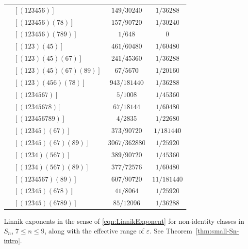 \documentclass[12pt]{amsart}
\theoremstyle{definition} \newtheorem{definition}[theorem]{Definition}
\theoremstyle{example} \newtheorem{example}[theorem]{Example}
\theoremstyle{remark} \newtheorem{remark}{Remark}[theorem]
\numberwithin{equation}{section}
\numberwithin{theorem}{section}
\renewcommand{\epsilon}{\varepsilon}
\renewcommand{\leq}{\leqslant}
\begin{document}
{\begin{table}[h]
\begin{minipage}[t]{0.45\textwidth}
\begin{tabular}{|l|l|c|c|}
					& $[(123456)]$ & $ 149/30240$ & $1/36288 $\\
					& $[(123456)(78)]$ & $ 157/90720$ & $1/30240 $\\
					& $[(123456)(789)]$ & $ 1/648$ & $ 0$\\
					& $[(123)(45)]$ & $  461/60480$ & $ 1/60480$\\
					& $[(123)(45)(67)]$ & $241/45360 $ & $1/36288 $\\
					& $[(123)(45)(67)(89)]$ & $67/5670 $ & $ 1/20160$\\
					& $[(123)(456)(78)]$ & $ 943/181440$ & $1/36288 $\\
					& $[(1234567)]$ & $ 5/1008$ & $ 1/45360$\\
					& $[(12345678)]$ & $ 67/18144$ & $1/60480 $ \\
					& $[(123456789)]$ & $ 4/2835$ & $1/22680 $ \\
					& $[(12345)(67)]$ & $ 373/90720$ & $1/181440 $ \\
					& $[(12345)(67)(89)]$ & $3067/362880 $ & $ 1/25920$\\
					& $[(1234)(567)]$ & $ 389/90720$ & $1/45360 $ \\
					& $[(1234)(567)(89)]$ & $ 377/72576$ & $1/60480 $ \\
					& $[(1234567)(89)]$ & $ 607/90720$ & $11/181440 $ \\
					& $[(12345)(678)]$ & $ 41/8064$ & $1/25920 $ \\
					& $[(12345)(6789)]$ & $ 85/12096$ & $1/36288 $ \\
					\hline
		\end{tabular}
		\end{minipage}
		\begin{caption}{\label{tbl:small-Sn-appendix} Linnik exponents in the sense of \eqref{eqn:LinnikExponent} for non-identity classes in $S_n$, $7 \leq n \leq 9$, along with the effective range of $\epsilon$.  See Theorem~\ref{thm:small-Sn-intro}.}\end{caption}
	\end{table}}
	
\end{document}

